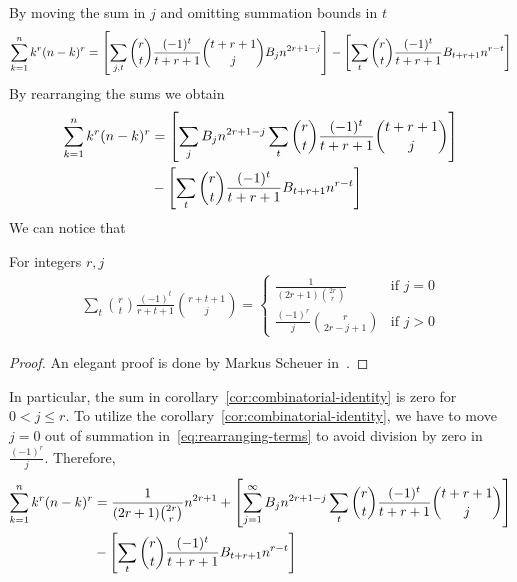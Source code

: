 By moving the sum in $j$ and omitting summation bounds in $t$
\begin{align*}
    \sum_{k=1}^{n} k^{r} (n-k)^{r}
    = \left[ \sum_{j, t} \binom{r}{t} \frac{(-1)^t}{t+r+1} \binom{t+r+1}{j} {B}\sb{j} n^{2r+1-j}  \right]
    - \left[ \sum_{t} \binom{r}{t} \frac{(-1)^t}{t+r+1} {B}\sb{t+r+1} n^{r-t} \right]
\end{align*}
By rearranging the sums we obtain
\begin{align}
    \label{eq:rearranging-terms}
    \sum_{k=1}^{n} k^{r} (n-k)^{r}
    &= \left[ \sum_{j} {B}\sb{j} n^{2r+1-j} \sum_{t} \binom{r}{t} \frac{(-1)^t}{t+r+1} \binom{t+r+1}{j}  \right] \\
    &- \left[ \sum_{t} \binom{r}{t} \frac{(-1)^t}{t+r+1} {B}\sb{t+r+1} n^{r-t} \right] \nonumber
\end{align}
We can notice that
\begin{corollary}
    \label{cor:combinatorial-identity}
    For integers $r, j$
    \begin{align*}
        \sum_{t} \binom{r}{t} \frac{(-1)^t}{r+t+1} \binom{r+t+1}{j}
        =\begin{cases}
             \frac{1}{(2r+1) \binom{2r}r} & \text{if } j=0\\
             \frac{(-1)^r}{j} \binom{r}{2r-j+1} & \text{if } j>0
        \end{cases}
    \end{align*}
    \begin{proof}
        An elegant proof is done by Markus Scheuer in~\cite{scheuer2023mathstackexchange}.
    \end{proof}
\end{corollary}
In particular, the sum in corollary~\eqref{cor:combinatorial-identity} is zero for $0< j \leq r$.
To utilize the corollary~\eqref{cor:combinatorial-identity}, we have to move $j=0$ out of summation
in~\eqref{eq:rearranging-terms} to avoid division by zero in $\frac{(-1)^r}{j}$.
Therefore,
\begin{equation*}
    \begin{split}
        \sum_{k=1}^{n} k^{r} (n-k)^{r}
        &= \frac{1}{(2r+1) \binom{2r}r} n^{2r+1}
        + \left[ \sum_{j = 1}^{\infty} {B}\sb{j} n^{2r+1-j} \sum_{t} \binom{r}{t} \frac{(-1)^t}{t+r+1} \binom{t+r+1}{j} \right] \\
        &- \left[ \sum_{t} \binom{r}{t} \frac{(-1)^t}{t+r+1} {B}\sb{t+r+1} n^{r-t} \right]
    \end{split}
\end{equation*}
